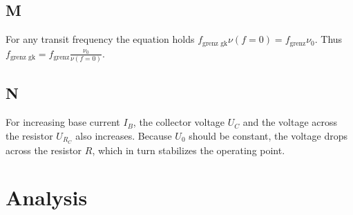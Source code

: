 \documentclass[a4paper,10pt]{article}
\numberwithin{equation}{section}
\begin{document}
\begin{multicols}{2}
	\subsection{M}
	For any transit frequency the equation holds $f_\text{grenz gk}\nu\left(f=0\right)=f_\text{grenz}\nu_0$.
	Thus $f_\text{grenz gk}=f_\text{grenz}\tfrac{\nu_0}{\nu\left(f=0\right)}$.

	\subsection{N}
	For increasing base current $I_B$, the collector voltage $U_C$ and the voltage across the resistor $U_{R_C}$ also increases.
	Because $U_0$ should be constant, the voltage drops across the resistor $R$, which in turn stabilizes the operating point.

	\clearpage
	\section{Analysis}

\end{multicols}
\end{document}
